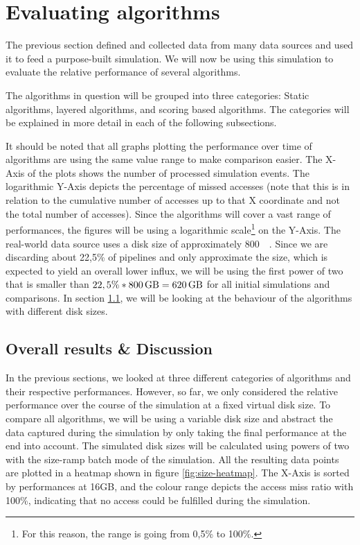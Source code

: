 \section{Evaluating algorithms}\label{sec:evaluation}
    The previous section defined and collected data from many data sources and used it to feed a purpose-built simulation. We will now be using this simulation to evaluate the relative performance of several algorithms.
    
    The algorithms in question will be grouped into three categories: Static algorithms, layered algorithms, and scoring based algorithms. The categories will be explained in more detail in each of the following subsections. %
    
    It should be noted that all graphs plotting the performance over time of algorithms are using the same value range to make comparison easier. The X-Axis of the plots shows the number of processed simulation events. The logarithmic Y-Axis depicts the percentage of missed accesses (note that this is in relation to the cumulative number of accesses up to that X coordinate and not the total number of accesses). Since the algorithms will cover a vast range of performances, the figures will be using a logarithmic scale\footnote{For this reason, the range is going from 0,5\% to 100\%.} on the Y-Axis. The real-world data source uses a disk size of approximately \SI{800}{\giga\byte}. Since we are discarding about 22,5\% of pipelines and only approximate the size, which is expected to yield an overall lower influx, we will be using the first power of two that is smaller than $22,5\% * \SI{800}{\giga\byte} = \SI{620}{\giga\byte}$ for all initial simulations and comparisons. In section \ref{sec:overall}, we will be looking at the behaviour of the algorithms with different disk sizes.
    
    
    
    

    \subsection{Overall results \& Discussion}\label{sec:overall}
        In the previous sections, we looked at three different categories of algorithms and their respective performances. However, so far, we only considered the relative performance over the course of the simulation at a fixed virtual disk size. To compare all algorithms, we will be using a variable disk size and abstract the data captured during the simulation by only taking the final performance at the end into account. The simulated disk sizes will be calculated using powers of two with the size-ramp batch mode of the simulation. All the resulting data points are plotted in a heatmap shown in figure \ref{fig:size-heatmap}. The X-Axis is sorted by performances at 16GB, and the colour range depicts the access miss ratio with 100\%, indicating that no access could be fulfilled during the simulation.
        
